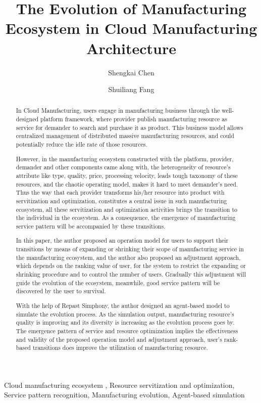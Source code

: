 
\title{The Evolution of Manufacturing Ecosystem in Cloud Manufacturing Architecture
}

\author[label1]{Shengkai Chen}
\author[label1]{Shuiliang Fang}
\address[label1]{Zhejiang University, Institute of manufacturing engineering and automation, Hangzhou City, Zhejiang Province, China}



\begin{abstract}
In Cloud Manufacturing, users engage in manufacturing business through the well-designed platform framework, where provider publish manufacturing resource as service for demander to search and purchase it as product. This business model allows centralized management of distributed massive manufacturing resources, and could potentially reduce the idle rate of those resources.

However, in the manufacturing ecosystem constructed with the platform, provider, demander and other components came along with, the heterogeneity of resource's attribute like type, quality, price, processing velocity, leads tough taxonomy of these resources, and the chaotic operating model, makes it hard to meet demander's need.
Thus the way that each provider transforms his/her resource into product with servitization and optimization, constitutes a central issue in such manufacturing ecosystem, all these servitization and optimization activities brings the transition to the individual in the ecosystem. As a consequence, the emergence of manufacturing service pattern will be accompanied by these transitions.

In this paper, the author proposed an operation model for users to support their transitions by means of expanding or shrinking their scope of manufacturing service in the manufacturing ecosystem, and the author also proposed an adjustment approach, which depends on the ranking value of user, for the system to restrict the expanding or shrinking procedure and to control the number of users. Gradually this adjustment will guide the evolution of the ecosystem, meanwhile, good service pattern will be discovered by the user to survival. 

With the help of Repast Simphony, the author designed an agent-based model to simulate the evolution process.
As the simulation output, manufacturing resource's quality is improving and its diversity is increasing as the evolution process goes by. The emergence pattern of service and resource optimization implies the effectiveness and validity of the proposed operation model and adjustment approach, user's rank-based transitions does improve the utilization of manufacturing resource.

\end{abstract}

\begin{keyword}
Cloud manufacturing ecosystem \sep
Resource servitization and optimization\sep
Service pattern recognition\sep
Manufacturing evolution\sep
Agent-based simulation

\end{keyword}
